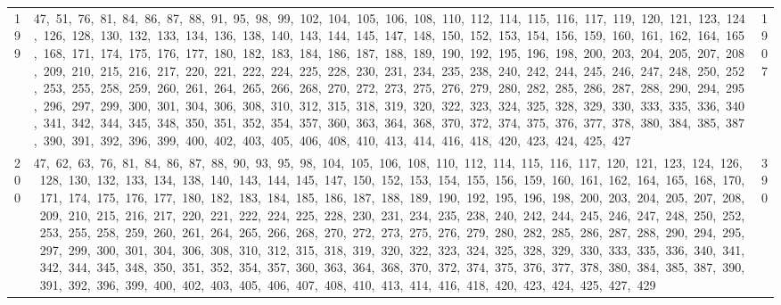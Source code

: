 \begin{longtable}{c|p{}|r}
199 & 47,\ 51,\ 76,\ 81,\ 84,\ 86,\ 87,\ 88,\ 91,\ 95,\ 98,\ 99,\ 102,\ 104,\ 105,\ 106,\ 108,\ 110,\ 112,\ 114,\ 115,\ 116,\ 117,\ 119,\ 120,\ 121,\ 123,\ 124,\ 126,\ 128,\ 130,\ 132,\ 133,\ 134,\ 136,\ 138,\ 140,\ 143,\ 144,\ 145,\ 147,\ 148,\ 150,\ 152,\ 153,\ 154,\ 156,\ 159,\ 160,\ 161,\ 162,\ 164,\ 165,\ 168,\ 171,\ 174,\ 175,\ 176,\ 177,\ 180,\ 182,\ 183,\ 184,\ 186,\ 187,\ 188,\ 189,\ 190,\ 192,\ 195,\ 196,\ 198,\ 200,\ 203,\ 204,\ 205,\ 207,\ 208,\ 209,\ 210,\ 215,\ 216,\ 217,\ 220,\ 221,\ 222,\ 224,\ 225,\ 228,\ 230,\ 231,\ 234,\ 235,\ 238,\ 240,\ 242,\ 244,\ 245,\ 246,\ 247,\ 248,\ 250,\ 252,\ 253,\ 255,\ 258,\ 259,\ 260,\ 261,\ 264,\ 265,\ 266,\ 268,\ 270,\ 272,\ 273,\ 275,\ 276,\ 279,\ 280,\ 282,\ 285,\ 286,\ 287,\ 288,\ 290,\ 294,\ 295,\ 296,\ 297,\ 299,\ 300,\ 301,\ 304,\ 306,\ 308,\ 310,\ 312,\ 315,\ 318,\ 319,\ 320,\ 322,\ 323,\ 324,\ 325,\ 328,\ 329,\ 330,\ 333,\ 335,\ 336,\ 340,\ 341,\ 342,\ 344,\ 345,\ 348,\ 350,\ 351,\ 352,\ 354,\ 357,\ 360,\ 363,\ 364,\ 368,\ 370,\ 372,\ 374,\ 375,\ 376,\ 377,\ 378,\ 380,\ 384,\ 385,\ 387,\ 390,\ 391,\ 392,\ 396,\ 399,\ 400,\ 402,\ 403,\ 405,\ 406,\ 408,\ 410,\ 413,\ 414,\ 416,\ 418,\ 420,\ 423,\ 424,\ 425,\ 427 & 1907 \\
200 & 47,\ 62,\ 63,\ 76,\ 81,\ 84,\ 86,\ 87,\ 88,\ 90,\ 93,\ 95,\ 98,\ 104,\ 105,\ 106,\ 108,\ 110,\ 112,\ 114,\ 115,\ 116,\ 117,\ 120,\ 121,\ 123,\ 124,\ 126,\ 128,\ 130,\ 132,\ 133,\ 134,\ 138,\ 140,\ 143,\ 144,\ 145,\ 147,\ 150,\ 152,\ 153,\ 154,\ 155,\ 156,\ 159,\ 160,\ 161,\ 162,\ 164,\ 165,\ 168,\ 170,\ 171,\ 174,\ 175,\ 176,\ 177,\ 180,\ 182,\ 183,\ 184,\ 185,\ 186,\ 187,\ 188,\ 189,\ 190,\ 192,\ 195,\ 196,\ 198,\ 200,\ 203,\ 204,\ 205,\ 207,\ 208,\ 209,\ 210,\ 215,\ 216,\ 217,\ 220,\ 221,\ 222,\ 224,\ 225,\ 228,\ 230,\ 231,\ 234,\ 235,\ 238,\ 240,\ 242,\ 244,\ 245,\ 246,\ 247,\ 248,\ 250,\ 252,\ 253,\ 255,\ 258,\ 259,\ 260,\ 261,\ 264,\ 265,\ 266,\ 268,\ 270,\ 272,\ 273,\ 275,\ 276,\ 279,\ 280,\ 282,\ 285,\ 286,\ 287,\ 288,\ 290,\ 294,\ 295,\ 297,\ 299,\ 300,\ 301,\ 304,\ 306,\ 308,\ 310,\ 312,\ 315,\ 318,\ 319,\ 320,\ 322,\ 323,\ 324,\ 325,\ 328,\ 329,\ 330,\ 333,\ 335,\ 336,\ 340,\ 341,\ 342,\ 344,\ 345,\ 348,\ 350,\ 351,\ 352,\ 354,\ 357,\ 360,\ 363,\ 364,\ 368,\ 370,\ 372,\ 374,\ 375,\ 376,\ 377,\ 378,\ 380,\ 384,\ 385,\ 387,\ 390,\ 391,\ 392,\ 396,\ 399,\ 400,\ 402,\ 403,\ 405,\ 406,\ 407,\ 408,\ 410,\ 413,\ 414,\ 416,\ 418,\ 420,\ 423,\ 424,\ 425,\ 427,\ 429 & 390 \\

\end{longtable}
